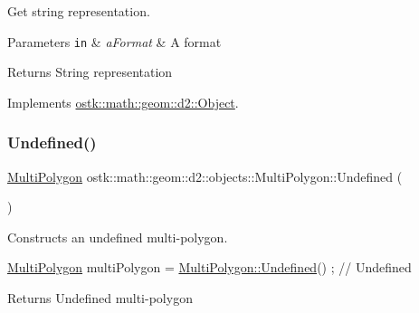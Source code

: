 Get string representation. 


\begin{DoxyParams}[1]{Parameters}
\mbox{\tt in}  & {\em a\+Format} & A format \\
\hline
\end{DoxyParams}
\begin{DoxyReturn}{Returns}
String representation 
\end{DoxyReturn}


Implements \hyperlink{classostk_1_1math_1_1geom_1_1d2_1_1_object_ada4c2187dd24ef02b91b6346191f677c}{ostk\+::math\+::geom\+::d2\+::\+Object}.

\mbox{\label{classostk_1_1math_1_1geom_1_1d2_1_1objects_1_1_multi_polygon_aa80a7642515417486bb846f869120fcd}} 
\subsubsection{\texorpdfstring{Undefined()}{Undefined()}}
{\footnotesize\ttfamily \hyperlink{classostk_1_1math_1_1geom_1_1d2_1_1objects_1_1_multi_polygon}{Multi\+Polygon} ostk\+::math\+::geom\+::d2\+::objects\+::\+Multi\+Polygon\+::\+Undefined (\begin{DoxyParamCaption}{ }\end{DoxyParamCaption})\hspace{0.3cm}{\ttfamily [static]}}



Constructs an undefined multi-\/polygon. 


\begin{DoxyCode}
\hyperlink{classostk_1_1math_1_1geom_1_1d2_1_1objects_1_1_multi_polygon_a70327c4d3f7f19f5ae9b32c0a715f1fd}{MultiPolygon} multiPolygon = \hyperlink{classostk_1_1math_1_1geom_1_1d2_1_1objects_1_1_multi_polygon_aa80a7642515417486bb846f869120fcd}{MultiPolygon::Undefined}() ; \textcolor{comment}{// Undefined}
\end{DoxyCode}


\begin{DoxyReturn}{Returns}
Undefined multi-\/polygon 
\end{DoxyReturn}
\mbox{\label{classostk_1_1math_1_1geom_1_1d2_1_1objects_1_1_multi_polygon_a0762c6a4b4aaa70082394df690f3c96c}} 
